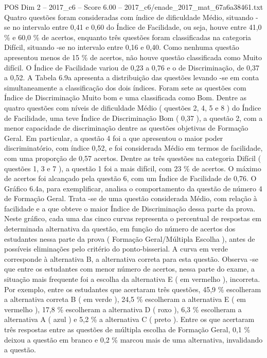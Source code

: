 \begin{textsample}{POS Dim 2 – 2017\_c6 – Score 6.00 – 2017\_c6/enade\_2017\_mat\_67a6a38461.txt}
Quatro questões foram consideradas com índice de dificuldade Médio, situando -se no intervalo entre 0,41 e 0,60 do Índice de Facilidade, ou seja, houve entre 41,0 \% e 60,0 \% de acertos, enquanto três questões foram classificadas na categoria Difícil, situando -se no intervalo entre 0,16 e 0,40.
Como nenhuma questão apresentou menos de 15 \% de acertos, não houve questão classificada como Muito difícil.
O Índice de Facilidade variou de 0,23 a 0,76 e o de Discriminação, de 0,37 a 0,52.
A Tabela 6.9a apresenta a distribuição das questões levando -se em conta simultaneamente a classificação dos dois índices.
Foram sete as questões com Índice de Discriminação Muito bom e uma classificada como Bom.
Dentre as quatro questões com níveis de dificuldade Médio ( questões 2, 4, 5 e 8 ) do Índice de Facilidade, uma teve Índice de Discriminação Bom ( 0,37 ), a questão 2, com a menor capacidade de discriminação dentre as questões objetivas de Formação Geral.
Em particular, a questão 4 foi a que apresentou o maior poder discriminatório, com índice 0,52, e foi considerada Médio em termos de facilidade, com uma proporção de 0,57 acertos.
Dentre as três questões na categoria Difícil ( questões 1, 3 e 7 ), a questão 1 foi a mais difícil, com 23 \% de acertos.
O máximo de acertos foi alcançado pela questão 6, com um Índice de Facilidade de 0,76.
O Gráfico 6.4a, para exemplificar, analisa o comportamento da questão de número 4 de Formação Geral.
Trata -se de uma questão considerada Médio, com relação à facilidade e a que obteve o maior Índice de Discriminação dessa parte da prova.
Neste gráfico, cada uma das cinco curvas representa o percentual de respostas em determinada alternativa da questão, em função do número de acertos dos estudantes nessa parte da prova ( Formação Geral/Múltipla Escolha ), antes de possíveis eliminações pelo critério do ponto-bisserial.
A curva em verde corresponde à alternativa B, a alternativa correta para esta questão.
Observa -se que entre os estudantes com menor número de acertos, nessa parte do exame, a situação mais frequente foi a escolha da alternativa E ( em vermelho ), incorreta.
Por exemplo, entre os estudantes que acertaram três questões, 45,9 \% escolheram a alternativa correta B ( em verde ), 24,5 \% escolheram a alternativa E ( em vermelho ), 17,8 \% escolheram a alternativa D ( roxo ), 6,3 \% escolheram a alternativa A ( azul ) e 5,2 \% a alternativa C ( preto ).
Entre os que acertaram três respostas entre as questões de múltipla escolha de Formação Geral, 0,1 \% deixou a questão em branco e 0,2 \% marcou mais de uma alternativa, invalidando a questão.

\end{textsample}
